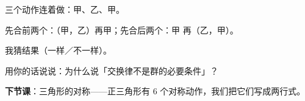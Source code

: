 \begin{dongshou}
  三个动作连着做：甲、乙、甲。

  先合前两个：（甲，乙）再甲；\qquad 先合后两个：甲 再（乙，甲）。

  我猜结果\underline{\hspace{2em}}（一样／不一样）。
\end{dongshou}

\begin{xiaojie}
  用你的话说说：为什么说「交换律不是群的必要条件」？
\end{xiaojie}

\noindent\textbf{下节课}：三角形的对称——正三角形有 \(6\) 个对称动作，我们把它们写成两行式。